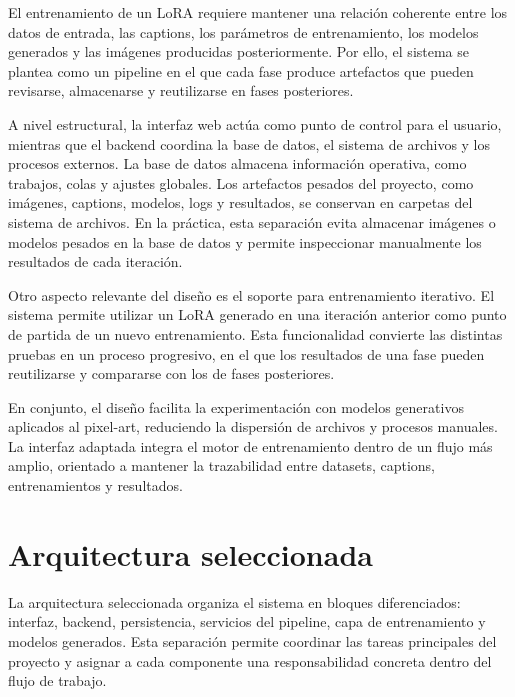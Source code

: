 \documentclass[a4paper,11pt,titlepage]{scrbook}
\begin{document}
\medskip

El entrenamiento de un LoRA requiere mantener una relación coherente entre los datos de entrada, las captions, los parámetros de entrenamiento, los modelos generados y las imágenes producidas posteriormente. Por ello, el sistema se plantea como un pipeline en el que cada fase produce artefactos que pueden revisarse, almacenarse y reutilizarse en fases posteriores.

\medskip

A nivel estructural, la interfaz web actúa como punto de control para el usuario, mientras que el backend coordina la base de datos, el sistema de archivos y los procesos externos. La base de datos almacena información operativa, como trabajos, colas y ajustes globales. Los artefactos pesados del proyecto, como imágenes, captions, modelos, logs y resultados, se conservan en carpetas del sistema de archivos. En la práctica, esta separación evita almacenar imágenes o modelos pesados en la base de datos y permite inspeccionar manualmente los resultados de cada iteración.

\medskip

Otro aspecto relevante del diseño es el soporte para entrenamiento iterativo. El sistema permite utilizar un LoRA generado en una iteración anterior como punto de partida de un nuevo entrenamiento. Esta funcionalidad convierte las distintas pruebas en un proceso progresivo, en el que los resultados de una fase pueden reutilizarse y compararse con los de fases posteriores.

\medskip

En conjunto, el diseño facilita la experimentación con modelos generativos aplicados al pixel-art, reduciendo la dispersión de archivos y procesos manuales. La interfaz adaptada integra el motor de entrenamiento dentro de un flujo más amplio, orientado a mantener la trazabilidad entre datasets, captions, entrenamientos y resultados.

\section{Arquitectura seleccionada}

La arquitectura seleccionada organiza el sistema en bloques diferenciados: interfaz, backend, persistencia, servicios del pipeline, capa de entrenamiento y modelos generados. Esta separación permite coordinar las tareas principales del proyecto y asignar a cada componente una responsabilidad concreta dentro del flujo de trabajo.
\end{document}
